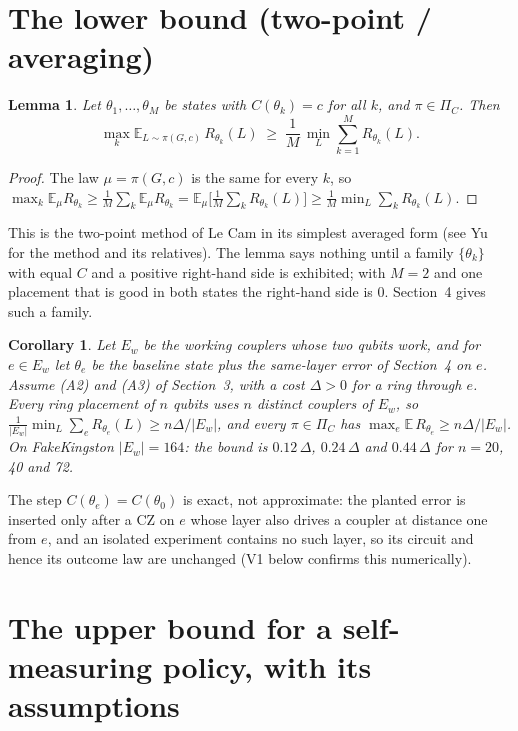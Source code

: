 \documentclass[10pt,a4paper]{article}
\newtheorem{lemma}{Lemma}
\newtheorem{corollary}{Corollary}
\theoremstyle{definition}
\theoremstyle{remark}
\begin{document}
\section{The lower bound (two-point / averaging)}

\begin{lemma}\label{lem:two}
Let $\theta_1,\dots,\theta_M$ be states with $C(\theta_k)=c$ for all $k$, and $\pi\in\Pi_C$. Then
\[
\max_k \mathbb E_{L\sim\pi(G,c)}\, R_{\theta_k}(L)\;\ge\;\frac1M\,\min_L \sum_{k=1}^M R_{\theta_k}(L).
\]
\end{lemma}
\begin{proof}
The law $\mu=\pi(G,c)$ is the same for every $k$, so
$\max_k \mathbb E_\mu R_{\theta_k} \ge \frac1M\sum_k \mathbb E_\mu R_{\theta_k} = \mathbb E_\mu\big[\frac1M\sum_k
R_{\theta_k}(L)\big] \ge \frac1M\min_L\sum_k R_{\theta_k}(L)$.
\end{proof}

This is the two-point method of Le Cam in its simplest averaged form (see Yu~\cite{yu1997} for the method and its
relatives). The lemma says nothing until a family $\{\theta_k\}$ with equal $C$ and a positive right-hand side is
exhibited; with $M=2$ and one placement that is good in both states the right-hand side is $0$. Section~4 gives such
a family.

\begin{corollary}\label{cor:ring}
Let $E_w$ be the working couplers whose two qubits work, and for $e\in E_w$ let $\theta_e$ be the baseline state
plus the same-layer error of Section~4 on $e$. Assume (A2) and (A3) of Section~3, with a cost $\Delta>0$ for a ring through $e$. Every
ring placement of $n$ qubits uses $n$ distinct couplers of $E_w$, so
$\frac{1}{|E_w|}\min_L\sum_e R_{\theta_e}(L)\ge n\Delta/|E_w|$, and every $\pi\in\Pi_C$ has
$\max_e \mathbb E\,R_{\theta_e}\ge n\Delta/|E_w|$. On FakeKingston $|E_w|=164$: the bound is $0.12\,\Delta$,
$0.24\,\Delta$ and $0.44\,\Delta$ for $n=20$, 40 and 72.
\end{corollary}
The step $C(\theta_e)=C(\theta_0)$ is exact, not approximate: the planted error is inserted only after a CZ on $e$
whose layer also drives a coupler at distance one from $e$, and an isolated experiment contains no such layer, so its
circuit and hence its outcome law are unchanged (V1 below confirms this numerically).

\section{The upper bound for a self-measuring policy, with its assumptions}
\end{document}
